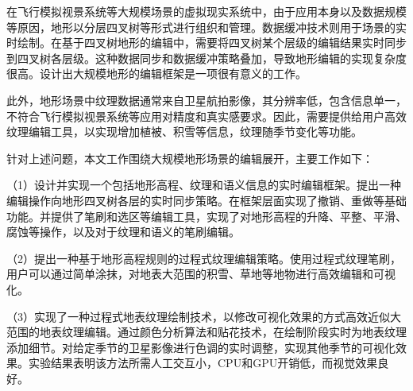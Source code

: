 
\begin{cabstract}
	在飞行模拟视景系统等大规模场景的虚拟现实系统中，由于应用本身以及数据规模等原因，地形以分层四叉树等形式进行组织和管理。数据缓冲技术则用于场景的实时绘制。在基于四叉树地形的编辑中，需要将四叉树某个层级的编辑结果实时同步到四叉树各层级。这种数据同步和数据缓冲策略叠加，导致地形编辑的实现复杂度很高。设计出大规模地形的编辑框架是一项很有意义的工作。\par
	此外，地形场景中纹理数据通常来自卫星航拍影像，其分辨率低，包含信息单一，不符合飞行模拟视景系统等应用对精度和真实感要求。因此，需要提供给用户高效纹理编辑工具，以实现增加植被、积雪等信息，纹理随季节变化等功能。\par
	针对上述问题，本文工作围绕大规模地形场景的编辑展开，主要工作如下：\par
	（1）设计并实现一个包括地形高程、纹理和语义信息的实时编辑框架。提出一种编辑操作向地形四叉树各层的实时同步策略。在框架层面实现了撤销、重做等基础功能。并提供了笔刷和选区等编辑工具，实现了对地形高程的升降、平整、平滑、腐蚀等操作，以及对于纹理和语义的笔刷编辑。\par
	（2）提出一种基于地形高程规则的过程式纹理编辑策略。使用过程式纹理笔刷，用户可以通过简单涂抹，对地表大范围的积雪、草地等地物进行高效编辑和可视化。\par
	（3）实现了一种过程式地表纹理绘制技术，以修改可视化效果的方式高效近似大范围的地表纹理编辑。通过颜色分析算法和贴花技术，在绘制阶段实时为地表纹理添加细节。对给定季节的卫星影像进行色调的实时调整，实现其他季节的可视化效果。实验结果表明该方法所需人工交互小，CPU和GPU开销低，而视觉效果良好。\par

\end{cabstract}
\cleardoublepage
